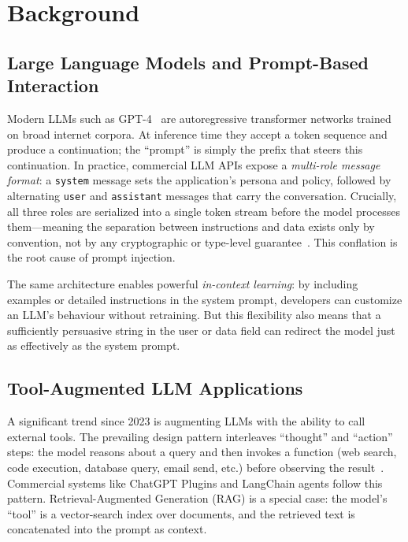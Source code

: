 \section{Background}
\label{sec:bg}

\subsection{Large Language Models and Prompt-Based Interaction}

Modern LLMs such as GPT-4~\cite{achiam2023gpt4} are autoregressive transformer networks trained on broad internet corpora. At inference time they accept a token sequence and produce a continuation; the ``prompt'' is simply the prefix that steers this continuation. In practice, commercial LLM APIs expose a \emph{multi-role message format}: a \texttt{system} message sets the application's persona and policy, followed by alternating \texttt{user} and \texttt{assistant} messages that carry the conversation. Crucially, all three roles are serialized into a single token stream before the model processes them---meaning the separation between instructions and data exists only by convention, not by any cryptographic or type-level guarantee~\cite{liu2024prompt}. This conflation is the root cause of prompt injection.

The same architecture enables powerful \emph{in-context learning}: by including examples or detailed instructions in the system prompt, developers can customize an LLM's behaviour without retraining. But this flexibility also means that a sufficiently persuasive string in the user or data field can redirect the model just as effectively as the system prompt.

\subsection{Tool-Augmented LLM Applications}

A significant trend since 2023 is augmenting LLMs with the ability to call external tools. The prevailing design pattern interleaves ``thought'' and ``action'' steps: the model reasons about a query and then invokes a function (web search, code execution, database query, email send, etc.) before observing the result~\cite{ruan2024toolemu}. Commercial systems like ChatGPT Plugins and LangChain agents follow this pattern. Retrieval-Augmented Generation (RAG) is a special case: the model's ``tool'' is a vector-search index over documents, and the retrieved text is concatenated into the prompt as context.

